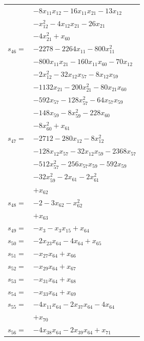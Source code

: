 \begin{longtable}{@{}r@{\;}l@{}}
 & \(\displaystyle -8x_{11}x_{12} -16x_{11}x_{21} -13x_{12}\) \\
 & \(\displaystyle -x_{12}^{2} -4x_{12}x_{21} -26x_{21}\) \\
 & \(\displaystyle -4x_{21}^{2} +x_{60}\) \\[3pt]
\(s_{46}=\) & \(\displaystyle -2278 -2264x_{11} -800x_{11}^{2}\) \\
 & \(\displaystyle -800x_{11}x_{21} -160x_{11}x_{60} -70x_{12}\) \\
 & \(\displaystyle -2x_{12}^{2} -32x_{12}x_{57} -8x_{12}x_{59}\) \\
 & \(\displaystyle -1132x_{21} -200x_{21}^{2} -80x_{21}x_{60}\) \\
 & \(\displaystyle -592x_{57} -128x_{57}^{2} -64x_{57}x_{59}\) \\
 & \(\displaystyle -148x_{59} -8x_{59}^{2} -228x_{60}\) \\
 & \(\displaystyle -8x_{60}^{2} +x_{61}\) \\[3pt]
\(s_{47}=\) & \(\displaystyle -2712 -280x_{12} -8x_{12}^{2}\) \\
 & \(\displaystyle -128x_{12}x_{57} -32x_{12}x_{59} -2368x_{57}\) \\
 & \(\displaystyle -512x_{57}^{2} -256x_{57}x_{59} -592x_{59}\) \\
 & \(\displaystyle -32x_{59}^{2} -2x_{61} -2x_{61}^{2}\) \\
 & \(\displaystyle +x_{62}\) \\[3pt]
\(s_{48}=\) & \(\displaystyle -2 -3x_{62} -x_{62}^{2}\) \\
 & \(\displaystyle +x_{63}\) \\[3pt]
\(s_{49}=\) & \(\displaystyle -x_{3} -x_{3}x_{15} +x_{64}\) \\[3pt]
\(s_{50}=\) & \(\displaystyle -2x_{23}x_{64} -4x_{64} +x_{65}\) \\[3pt]
\(s_{51}=\) & \(\displaystyle -x_{27}x_{64} +x_{66}\) \\[3pt]
\(s_{52}=\) & \(\displaystyle -x_{29}x_{64} +x_{67}\) \\[3pt]
\(s_{53}=\) & \(\displaystyle -x_{31}x_{64} +x_{68}\) \\[3pt]
\(s_{54}=\) & \(\displaystyle -x_{33}x_{64} +x_{69}\) \\[3pt]
\(s_{55}=\) & \(\displaystyle -4x_{11}x_{64} -2x_{37}x_{64} -4x_{64}\) \\
 & \(\displaystyle +x_{70}\) \\[3pt]
\(s_{56}=\) & \(\displaystyle -4x_{38}x_{64} -2x_{39}x_{64} +x_{71}\) \\[3pt]

\end{longtable}
